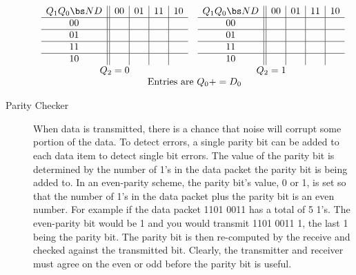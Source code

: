 \begin{description}
{            $$
            \begin{array}{cc}
                \begin{array} {c||c|c|c|c}
                    Q_1 Q_0 \bs ND    & 00 & 01 & 11 & 10 \\ \hline
                    00            &    &   &   &    \\ \hline
                    01            &    &   &   &    \\ \hline
                    11            &    &   &   &   \\ \hline
                    10            &    &   &   &    \\
                \end{array}
                &
                \begin{array} {c||c|c|c|c}
                    Q_1 Q_0 \bs ND    & 00 & 01 & 11 & 10 \\ \hline
                    00            &   &   &   &   \\ \hline
                    01            &   &   &   &   \\ \hline
                    11            &   &   &   &   \\ \hline
                    10            &   &   &   &   \\
                \end{array} \\
                Q_2=0 & Q_2=1 \\
                \multicolumn{2}{c}{\text{ Entries\ are\ } Q_0+=D_0}
            \end{array} $$
        }

    \item[Parity Checker]
        When data is transmitted, there is a chance that noise will corrupt some portion of the data.
        To detect errors, a single parity bit can be added to each data item to detect single bit errors.
        The value of the parity bit is determined by the number of 1's in the data packet the parity bit
        is being added to.  In an even-parity scheme, the parity bit's value, 0 or 1, is set so that the
        number of 1's in the data packet plus the parity bit is an even number.  For example if
        the data packet 1101 0011 has a total of 5 1's.  The even-parity bit would be 1 and
        you would transmit 1101 0011 1, the last 1 being the parity bit.  The parity bit is
        then re-computed by the receive and checked against the transmitted bit.  Clearly,
        the transmitter and receiver must agree on the even or odd before the parity bit
        is useful.


\end{description}
